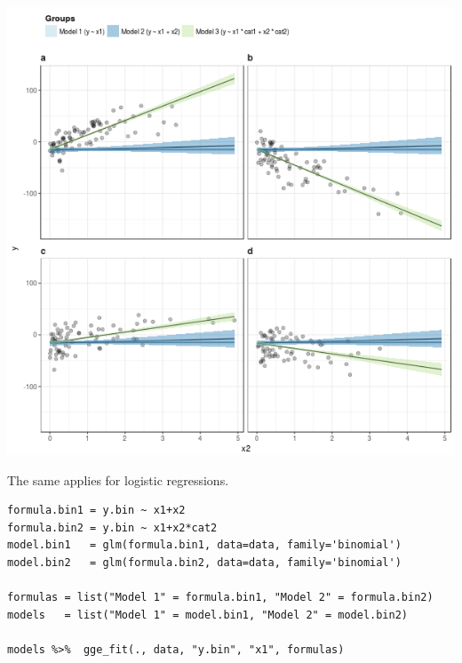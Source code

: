 \documentclass[a4paper]{article}
\begin{document}
\begin{enumerate}
\begin{center}
\includegraphics[width=.9\linewidth]{fig-fitted-many-models-1.png}
\end{center}


The same applies for logistic regressions.


\lstset{numbers=left,language=r,label= ,caption= ,captionpos=b}
\begin{lstlisting}
formula.bin1 = y.bin ~ x1+x2
formula.bin2 = y.bin ~ x1+x2*cat2
model.bin1   = glm(formula.bin1, data=data, family='binomial')
model.bin2   = glm(formula.bin2, data=data, family='binomial')

formulas = list("Model 1" = formula.bin1, "Model 2" = formula.bin2)
models   = list("Model 1" = model.bin1, "Model 2" = model.bin2)

models %>%  gge_fit(., data, "y.bin", "x1", formulas)


\end{lstlisting}


\end{enumerate}
\end{document}
